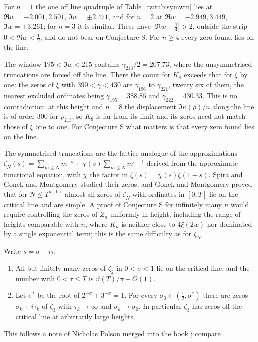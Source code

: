 For $n=1$ the one off line quadruple of Table~\ref{rz:tab:symwin} lies at $\Re w=-2.001,2.501$, $\Im w=\pm2.471$, and for $n=2$ at $\Re w=-2.949,3.449$, $\Im w=\pm3.261$; for $n=3$ it is similar. These have $|\Re w-\frac14|>2$, outside the strip $0<\Re w<\frac12$, and do not bear on Conjecture S. For $n\ge4$ every zero found lies on the line.

The window $195<\Im w<215$ contains $\gamma_{213}/2=207.73$, where the unsymmetrised truncations are forced off the line. There the count for $K_8$ exceeds that for $\xi$ by one: the zeros of $\xi$ with $390<\gamma<430$ are $\gamma_{196}$ to $\gamma_{221}$, twenty six of them, the nearest excluded ordinates being $\gamma_{195}=388.85$ and $\gamma_{222}=430.33$. This is no contradiction: at this height and $n=8$ the displacement $\Im\kappa(\rho)/n$ along the line is of order $300$ for $\rho_{213}$, so $K_8$ is far from its limit and its zeros need not match those of $\xi$ one to one. For Conjecture S what matters is that every zero found lies on the line.

The symmetrised truncations are the lattice analogue of the approximations $\zeta_N(s)=\sum_{m\le N}m^{-s}+\chi(s)\sum_{m\le N}m^{s-1}$ derived from the approximate functional equation, with $\chi$ the factor in $\zeta(s)=\chi(s)\zeta(1-s)$. Spira \cite[Section 6]{Spira67} and Gonek and Montgomery \cite{GonekMontgomery13} studied their zeros, and Gonek and Montgomery proved that for $N\le T^{o(1)}$ almost all zeros of $\zeta_N$ with ordinates in $[0,T]$ lie on the critical line and are simple. A proof of Conjecture S for infinitely many $n$ would require controlling the zeros of $Z_n$ uniformly in height, including the range of heights comparable with $n$, where $K_n$ is neither close to $4\xi(2w)$ nor dominated by a single exponential term; this is the same difficulty as for $\zeta_N$.

\begin{proposition}\label{rz:prop:zetaN}
Write $s=\sigma+i\tau$.
\begin{enumerate}
\item[(i)] All but finitely many zeros of $\zeta_2$ in $0<\sigma<1$ lie on the critical line, and the number with $0<\tau\le T$ is $\vartheta(T)/\pi+O(1)$.
\item[(ii)] Let $\sigma^*$ be the root of $2^{-\sigma}+3^{-\sigma}=1$. For every $\sigma_0\in(\frac12,\sigma^*)$ there are zeros $\sigma_k+i\tau_k$ of $\zeta_3$ with $\tau_k\to\infty$ and $\sigma_k\to\sigma_0$. In particular $\zeta_3$ has zeros off the critical line at arbitrarily large heights.
\end{enumerate}
This follows a note of Nicholas Polson merged into the book \cite{P26gumbelop}; compare \cite{Spira67,GonekMontgomery13}.
\end{proposition}

